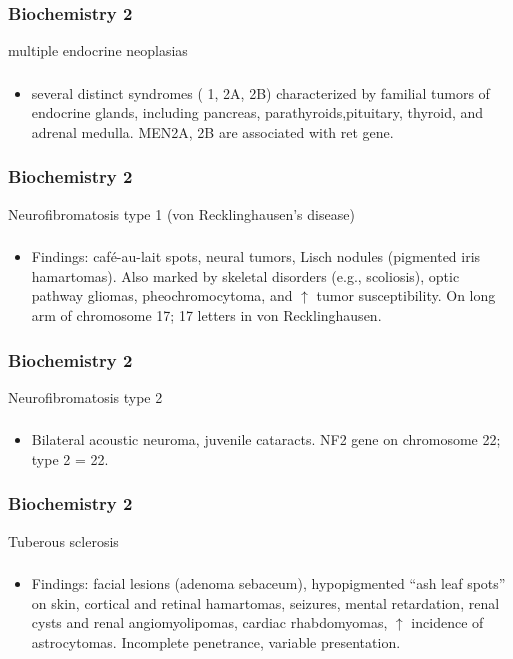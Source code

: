 \documentclass[11pt]{beamer}
\begin{document}
\begin{frame}
 \frametitle{Biochemistry 2}
multiple endocrine neoplasias
\end{frame}

\begin{frame}
 \frametitle{}
\begin{itemize}
\item  several distinct syndromes ( 1, 2A, 2B) characterized by familial tumors of endocrine glands, including pancreas, parathyroids,pituitary, thyroid, and adrenal medulla. MEN2A, 2B are associated with ret gene. 
\end{itemize}
\end{frame}

\begin{frame}
 \frametitle{Biochemistry 2}
Neurofibromatosis type 1 (von Recklinghausen’s disease)
\end{frame}

\begin{frame}
 \frametitle{}
\begin{itemize}
\item Findings: café-au-lait spots, neural tumors, Lisch nodules (pigmented iris hamartomas). Also marked by skeletal disorders (e.g., scoliosis), optic pathway gliomas, pheochromocytoma, and ${\uparrow}$ tumor susceptibility. On long arm of chromosome 17; 17 letters in von Recklinghausen.
\end{itemize}
\end{frame}

\begin{frame}
 \frametitle{Biochemistry 2}
Neurofibromatosis type 2
\end{frame}

\begin{frame}
 \frametitle{}
\begin{itemize}
\item Bilateral acoustic neuroma, juvenile cataracts. NF2 gene on chromosome 22; type 2 = 22.
\end{itemize}
\end{frame}

\begin{frame}
 \frametitle{Biochemistry 2}
Tuberous sclerosis
\end{frame}

\begin{frame}
 \frametitle{}
\begin{itemize}
\item Findings: facial lesions (adenoma sebaceum), hypopigmented “ash leaf spots” on skin, cortical and retinal hamartomas, seizures, mental retardation, renal cysts and renal angiomyolipomas, cardiac rhabdomyomas, ${\uparrow}$ incidence of astrocytomas. Incomplete penetrance, variable presentation.
\end{itemize}
\end{frame}
\end{document}
